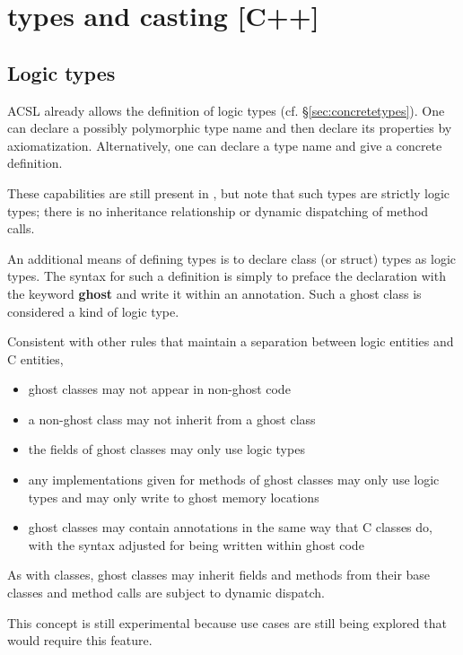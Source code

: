 \section{\lang{} types and casting [C++]}
\label{sec:types}

\subsection{Logic types}

ACSL already allows the definition of logic types (cf. \S\ref{sec:concretetypes}). One can declare a possibly polymorphic type name and then declare its properties by axiomatization. Alternatively, one can declare 
a type name and give a concrete definition.

These capabilities are still present in \NAME{}, but note that such types are strictly logic types; there is no inheritance relationship or dynamic dispatching of method calls.

\experimental

An additional means of defining types is to declare
\lang{} class (or struct) types as logic types. The syntax for such a definition is simply to preface the declaration
with the keyword \textbf{ghost} and write it within an \NAME{} annotation. Such a ghost class is considered a kind of logic type.

Consistent with other rules that maintain a separation between logic entities and C entities,
\begin{itemize}
	\item ghost classes may not appear in non-ghost code
	\item a non-ghost class may not inherit from a ghost class
	\item the fields of ghost classes may only use logic types
	\item any implementations given for methods of ghost classes may only use logic types and may only write to ghost memory locations
	\item ghost classes may contain \NAME{} annotations in the same way that C classes do, with the syntax adjusted for being written within ghost code
\end{itemize}

As with \lang{} classes, ghost classes may inherit fields and methods from their base classes and method calls are subject to dynamic dispatch.

This concept is still experimental because use cases are still being explored that would require this feature.

